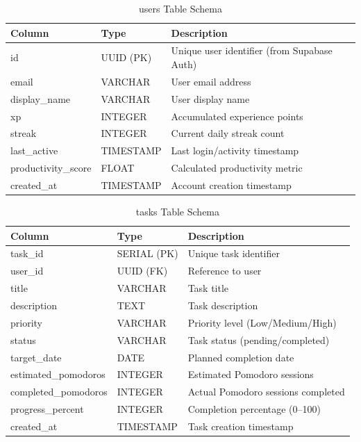 \begin{table}[htbp]
\centering
\begin{tabular}{|l|l|l|}
\hline
\textbf{Column} & \textbf{Type} & \textbf{Description} \\
\hline
id & UUID (PK) & Unique user identifier (from Supabase Auth) \\
email & VARCHAR & User email address \\
display\_name & VARCHAR & User display name \\
xp & INTEGER & Accumulated experience points \\
streak & INTEGER & Current daily streak count \\
last\_active & TIMESTAMP & Last login/activity timestamp \\
productivity\_score & FLOAT & Calculated productivity metric \\
created\_at & TIMESTAMP & Account creation timestamp \\
\hline
\end{tabular}
\caption{users Table Schema}
\end{table}

\begin{table}[htbp]
\centering
\begin{tabular}{|l|l|l|}
\hline
\textbf{Column} & \textbf{Type} & \textbf{Description} \\
\hline
task\_id & SERIAL (PK) & Unique task identifier \\
user\_id & UUID (FK) & Reference to user \\
title & VARCHAR & Task title \\
description & TEXT & Task description \\
priority & VARCHAR & Priority level (Low/Medium/High) \\
status & VARCHAR & Task status (pending/completed) \\
target\_date & DATE & Planned completion date \\
estimated\_pomodoros & INTEGER & Estimated Pomodoro sessions \\
completed\_pomodoros & INTEGER & Actual Pomodoro sessions completed \\
progress\_percent & INTEGER & Completion percentage (0--100) \\
created\_at & TIMESTAMP & Task creation timestamp \\
\hline
\end{tabular}
\caption{tasks Table Schema}
\end{table}

